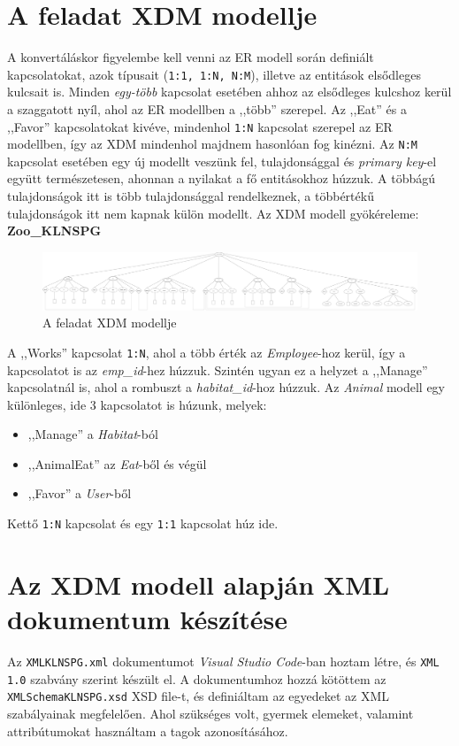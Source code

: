 \documentclass[12pt]{report}
\begin{document}
\section[XDM modell]{A feladat XDM modellje}

\indent\indent A konvertáláskor figyelembe kell venni az ER modell során definiált kapcsolatokat, azok típusait (\texttt{1:1, 1:N, N:M}), illetve az entitások elsődleges kulcsait is. Minden \textit{egy-több} kapcsolat esetében ahhoz az elsődleges kulcshoz kerül a szaggatott nyíl, ahol az ER modellben a ,,több'' szerepel. Az ,,Eat'' és a ,,Favor'' kapcsolatokat kivéve, mindenhol \texttt{1:N} kapcsolat szerepel az ER modellben, így az XDM mindenhol majdnem hasonlóan fog kinézni. Az \texttt{N:M} kapcsolat esetében egy új modellt veszünk fel, tulajdonsággal és \textit{primary key}-el együtt természetesen, ahonnan a nyilakat a fő entitásokhoz húzzuk. A többágú tulajdonságok itt is több tulajdonsággal rendelkeznek, a többértékű tulajdonságok itt nem kapnak külön modellt. Az XDM modell gyökéreleme: \textbf{Zoo\_KLNSPG}

\begin{figure}[h]
	\centering
	\includegraphics[width=1.01\linewidth]{XDMKLNSPG.png}
	\caption{A feladat XDM modellje}
\end{figure}

A ,,Works'' kapcsolat \texttt{1:N}, ahol a több érték az \textit{Employee}-hoz kerül, így a kapcsolatot is az \textit{emp\_id}-hez húzzuk. Szintén ugyan ez a helyzet a ,,Manage'' kapcsolatnál is, ahol a rombuszt a \textit{habitat\_id}-hoz húzzuk. Az \textit{Animal} modell egy különleges, ide 3 kapcsolatot is húzunk, melyek:

\begin{itemize}
	\item ,,Manage'' a \textit{Habitat}-ból
	\item ,,AnimalEat'' az \textit{Eat}-ből és végül
	\item ,,Favor'' a \textit{User}-ből 
\end{itemize}
Kettő \texttt{1:N} kapcsolat és egy \texttt{1:1} kapcsolat húz ide.

\section[Az XML dokumentum]{Az XDM modell alapján XML dokumentum készítése}
\indent\indent Az \texttt{XMLKLNSPG.xml} dokumentumot \textit{Visual Studio Code}-ban hoztam létre, és \texttt{XML 1.0} szabvány szerint készült el. A dokumentumhoz hozzá kötöttem az \texttt{XMLSchemaKLNSPG.xsd} XSD file-t, és definiáltam az egyedeket az XML szabályainak megfelelően. Ahol szükséges volt, gyermek elemeket, valamint attribútumokat használtam a tagok azonosításához.
\end{document}
